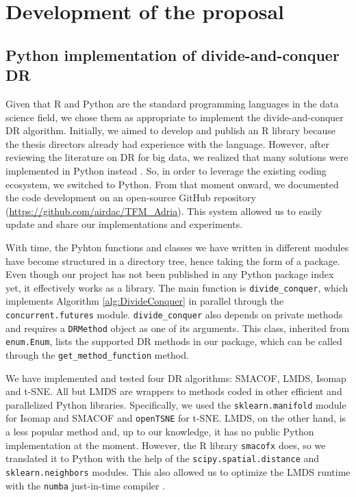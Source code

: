 \section{Development of the proposal}

\subsection{Python implementation of divide-and-conquer DR}

Given that R and Python are the standard programming languages in the data science field, we chose them as appropriate to implement the divide-and-conquer  DR algorithm. Initially, we aimed to develop and publish an R library because the thesis directors already had experience with the language. However, after reviewing the literature on DR for big data, we realized that many solutions were implemented in Python instead \citep{Reichmann2024}. So, in order to leverage the existing coding ecosystem, we switched to Python. From that moment onward, we documented the code development on an open-source GitHub repository (\href{https://github.com/airdac/TFM_Adria}{https://github.com/airdac/TFM\_Adria}). This system allowed us to easily update and share our implementations and experiments.

With time, the Pyhton functions and classes we have written in different modules have become structured in a directory tree, hence taking the form of a package. Even though our project has not been published in any Python package index yet, it effectively works as a library. The main function is \verb|divide_conquer|, which implements Algorithm \ref{alg:DivideConquer} in parallel through the \verb|concurrent.futures| module. \verb|divide_conquer| also depends on private methods and requires a \verb|DRMethod| object as one of its arguments. This class, inherited from \verb|enum.Enum|, lists the supported DR methods in our package, which can be called through the \verb|get_method_function| method.

We have implemented and tested four DR algorithms: SMACOF, LMDS, Isomap and t-SNE. All but LMDS are wrappers to methods coded in other efficient and parallelized Python libraries. Specifically, we used the \verb|sklearn.manifold| module \citep{Pedregosa2011} for Isomap and SMACOF and \verb|openTSNE| \citep{Poličar2023} for t-SNE. LMDS, on the other hand, is a less popular method and, up to our knowledge, it has no public Python implementation at the moment. However, the R library \verb|smacofx| \citep{Leeuw2009} does, so we translated it to Python with the help of the \verb|scipy.spatial.distance| and \verb|sklearn.neighbors| modules. This also allowed us to optimize the LMDS runtime with the \verb|numba| just-in-time compiler \citep{Lam2015, Aycock2003}.

